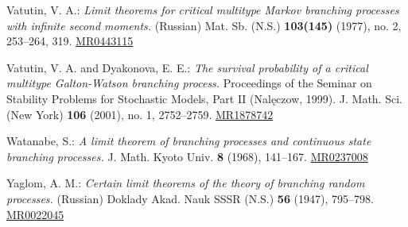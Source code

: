 \documentclass[12pt,a4paper]{article}
\theoremstyle{plain}
\theoremstyle{definition}
\numberwithin{equation}{section}
\def\MR#1{\href{http://www.ams.org/mathscinet-getitem?mr=#1}{MR#1}}
\begin{document}
\begin{thebibliography}{10}
Vatutin, V. A.:
\emph{Limit theorems for critical multitype Markov branching processes with infinite second moments.} (Russian) 
Mat. Sb. (N.S.) \textbf{103(145)} (1977), no. 2, 253–264, 319.
\MR{0443115}

Vatutin, V. A. and Dyakonova, E. E.:
\emph{The survival probability of a critical multitype Galton-Watson branching process.}
Proceedings of the Seminar on Stability Problems for Stochastic Models, Part II (Nalęczow, 1999). 
J. Math. Sci. (New York) \textbf{106} (2001), no. 1, 2752–2759. 
\MR{1878742}

Watanabe, S.:
\emph{A limit theorem of branching processes and continuous state branching processes.}
J. Math. Kyoto Univ. \textbf{8} (1968), 141--167.
\MR{0237008}

Yaglom, A. M.:
\emph{Certain limit theorems of the theory of branching random processes.} (Russian)
Doklady Akad. Nauk SSSR (N.S.) \textbf{56} (1947), 795--798. 
\MR{0022045}

\end{thebibliography}
\end{document}
